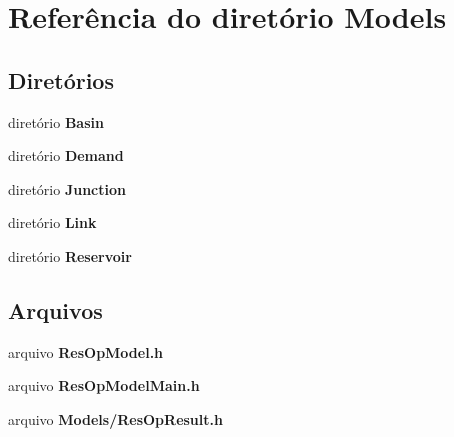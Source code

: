 \section{Referência do diretório Models}
\label{dir_eba3dd6f2acad61ab0f04f1481d1c198}
\subsection*{Diretórios}
\begin{DoxyCompactItemize}
\item 
diretório {\bf Basin}
\item 
diretório {\bf Demand}
\item 
diretório {\bf Junction}
\item 
diretório {\bf Link}
\item 
diretório {\bf Reservoir}
\end{DoxyCompactItemize}
\subsection*{Arquivos}
\begin{DoxyCompactItemize}
\item 
arquivo {\bf Res\+Op\+Model.\+h}
\item 
arquivo {\bf Res\+Op\+Model\+Main.\+h}
\item 
arquivo {\bf Models/\+Res\+Op\+Result.\+h}
\end{DoxyCompactItemize}
